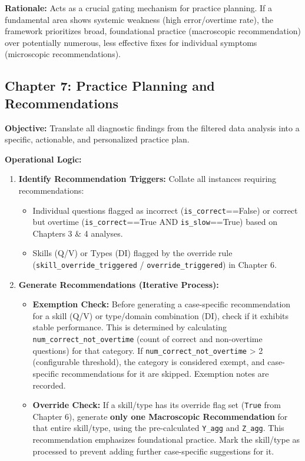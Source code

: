 \documentclass{article}
\begin{document}
\textbf{Rationale:} Acts as a crucial gating mechanism for practice planning. If a fundamental area shows systemic weakness (high error/overtime rate), the framework prioritizes broad, foundational practice (macroscopic recommendation) over potentially numerous, less effective fixes for individual symptoms (microscopic recommendations).

\subsection{Chapter 7: Practice Planning and Recommendations}

\textbf{Objective:} Translate all diagnostic findings from the filtered data analysis into a specific, actionable, and personalized practice plan.

\textbf{Operational Logic:}
\begin{enumerate}
    \item \textbf{Identify Recommendation Triggers:} Collate all instances requiring recommendations:
    \begin{itemize}
        \item Individual questions flagged as incorrect (\texttt{is\_correct}==False) or correct but overtime (\texttt{is\_correct}==True AND \texttt{is\_slow}==True) based on Chapters 3 \& 4 analyses.
        \item Skills (Q/V) or Types (DI) flagged by the override rule (\texttt{skill\_override\_triggered} / \texttt{override\_triggered}) in Chapter 6.
    \end{itemize}
    \item \textbf{Generate Recommendations (Iterative Process):}
    \begin{itemize}
        \item \textbf{Exemption Check:} Before generating a case-specific recommendation for a skill (Q/V) or type/domain combination (DI), check if it exhibits stable performance. This is determined by calculating \texttt{num\_correct\_not\_overtime} (count of correct and non-overtime questions) for that category. If \texttt{num\_correct\_not\_overtime} > 2 (configurable threshold), the category is considered exempt, and case-specific recommendations for it are skipped. Exemption notes are recorded.
        \item \textbf{Override Check:} If a skill/type has its override flag set (\texttt{True} from Chapter 6), generate \textbf{only one Macroscopic Recommendation} for that entire skill/type, using the pre-calculated \texttt{Y\_agg} and \texttt{Z\_agg}. This recommendation emphasizes foundational practice. Mark the skill/type as processed to prevent adding further case-specific suggestions for it.

\end{itemize}
\end{enumerate}
\end{document}
